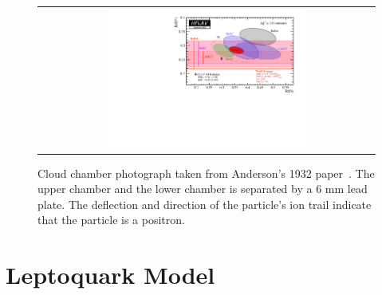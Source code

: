 \begin{figure}[tbh!]
 \begin{center}
 \begin{tabular}{c}
 \includegraphics[width=0.6\textwidth]{figures/Part1/BSM/RD}
 \end{tabular}
 \caption{Cloud chamber photograph taken from Anderson's 1932 paper~\cite{HFLAV}. The upper chamber and the lower chamber is separated by a 6 mm lead plate. The deflection and direction of the particle's ion trail indicate that the particle is a positron.}
 \label{fig:Positron}
 \end{center}
\end{figure}

\section{Leptoquark Model}

\cite{Pati:1973uk}